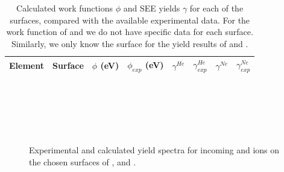 \begin{refsection}
\begin{table}[ht] 
\centering 
\renewcommand{\arraystretch}{1.3} 
\caption{Calculated work functions $\phi$ and \gls{SEE} yields $\gamma$ for each of 
the surfaces, compared with the available experimental data. For the work 
function of  and  we do not have specific data for each surface. 
Similarly, we only know the surface for the yield results of  and 
.} 
\label{quotas:tab-metal_results} 
\begin{tabular}{c @{\hskip 1em} | @{\hskip 1em} c @{\hskip 1em} | @{\hskip 
1em}  c @{\hskip 1em} c @{\hskip 1em} | @{\hskip 1em}  c @{\hskip 2em}  c 
@{\hskip 1em} | @{\hskip 1em} c @{\hskip 2em} c} 
 Element & Surface & $\phi$ (\si{\electronvolt}) & $\phi_{exp}$ 
(\si{\electronvolt}) & $\gamma^{He}$ & $\gamma^{He}_{exp}$ & $\gamma^{Ne}$ & 
$\gamma^{Ne}_{exp}$ \\\hline 
 
\hline 
\end{tabular} 
\end{table} \clearpage
 
\begin{figure}[!ht]
    \centering 
    \captionsetup{width=0.9\textwidth}
    \begin{subfigure}[t]{0.49\textwidth} 
        \centering 
         
    \end{subfigure}%
    ~  
    \begin{subfigure}[t]{0.49\textwidth} 
        \centering 
         
    \end{subfigure} 
    \begin{subfigure}[t]{0.49\textwidth} 
        \centering 
         
    \end{subfigure}%
    ~  
    \begin{subfigure}[t]{0.49\textwidth} 
        \centering 
         
    \end{subfigure} 
    \begin{subfigure}[t]{0.49\textwidth} 
        \centering 
         
    \end{subfigure}%
    ~  
    \begin{subfigure}[t]{0.49\textwidth} 
        \centering 
         
    \end{subfigure} 
    \caption{\label{quotas:fig-metals_results1} Experimental and calculated 
yield spectra for incoming  and  ions on the chosen surfaces of ,  and .} 
\end{figure} \clearpage 


\end{refsection}
